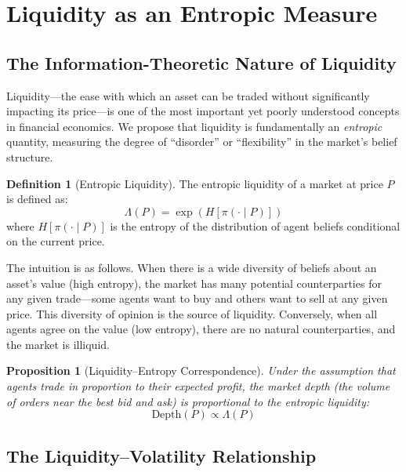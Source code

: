\documentclass[12pt,a4paper]{article}
\newtheorem{proposition}[theorem]{Proposition}
\theoremstyle{definition}
\newtheorem{definition}[theorem]{Definition}
\begin{document}
\section{Liquidity as an Entropic Measure}\label{sec:liquidity}

\subsection{The Information-Theoretic Nature of Liquidity}

Liquidity---the ease with which an asset can be traded without significantly impacting its price---is one of the most important yet poorly understood concepts in financial economics. We propose that liquidity is fundamentally an \emph{entropic} quantity, measuring the degree of ``disorder'' or ``flexibility'' in the market's belief structure.

\begin{definition}[Entropic Liquidity]\label{def:entropic_liq}
The entropic liquidity of a market at price $P$ is defined as:
\begin{equation}\label{eq:entropic_liq}
    \Lambda(P) = \exp\left(H[\pi(\cdot \mid P)]\right)
\end{equation}
where $H[\pi(\cdot \mid P)]$ is the entropy of the distribution of agent beliefs conditional on the current price.
\end{definition}

The intuition is as follows. When there is a wide diversity of beliefs about an asset's value (high entropy), the market has many potential counterparties for any given trade---some agents want to buy and others want to sell at any given price. This diversity of opinion is the source of liquidity. Conversely, when all agents agree on the value (low entropy), there are no natural counterparties, and the market is illiquid.

\begin{proposition}[Liquidity--Entropy Correspondence]\label{prop:liq_entropy}
Under the assumption that agents trade in proportion to their expected profit, the market depth (the volume of orders near the best bid and ask) is proportional to the entropic liquidity:
\begin{equation}
    \text{Depth}(P) \propto \Lambda(P)
\end{equation}
\end{proposition}

\subsection{The Liquidity--Volatility Relationship}
\end{document}
